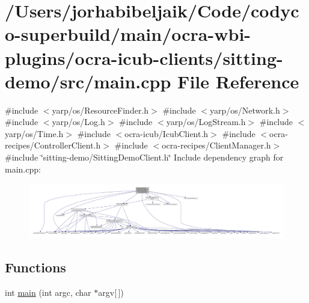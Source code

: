 \hypertarget{ocra-icub-clients_2sitting-demo_2src_2main_8cpp}{}\section{/\+Users/jorhabibeljaik/\+Code/codyco-\/superbuild/main/ocra-\/wbi-\/plugins/ocra-\/icub-\/clients/sitting-\/demo/src/main.cpp File Reference}
\label{ocra-icub-clients_2sitting-demo_2src_2main_8cpp}
{\ttfamily \#include $<$yarp/os/\+Resource\+Finder.\+h$>$}\newline
{\ttfamily \#include $<$yarp/os/\+Network.\+h$>$}\newline
{\ttfamily \#include $<$yarp/os/\+Log.\+h$>$}\newline
{\ttfamily \#include $<$yarp/os/\+Log\+Stream.\+h$>$}\newline
{\ttfamily \#include $<$yarp/os/\+Time.\+h$>$}\newline
{\ttfamily \#include $<$ocra-\/icub/\+Icub\+Client.\+h$>$}\newline
{\ttfamily \#include $<$ocra-\/recipes/\+Controller\+Client.\+h$>$}\newline
{\ttfamily \#include $<$ocra-\/recipes/\+Client\+Manager.\+h$>$}\newline
{\ttfamily \#include \char`\"{}sitting-\/demo/\+Sitting\+Demo\+Client.\+h\char`\"{}}\newline
Include dependency graph for main.\+cpp\+:
\nopagebreak
\begin{figure}[H]
\begin{center}
\leavevmode
\includegraphics[width=350pt]{ocra-icub-clients_2sitting-demo_2src_2main_8cpp__incl}
\end{center}
\end{figure}
\subsection*{Functions}
\begin{DoxyCompactItemize}
\item 
int \hyperlink{ocra-icub-clients_2sitting-demo_2src_2main_8cpp_a0ddf1224851353fc92bfbff6f499fa97}{main} (int argc, char $\ast$argv\mbox{[}$\,$\mbox{]})
\end{DoxyCompactItemize}


